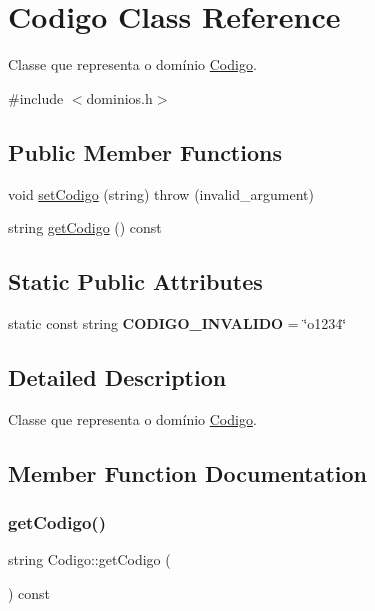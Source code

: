 \hypertarget{classCodigo}{}\section{Codigo Class Reference}
\label{classCodigo}


Classe que representa o domínio \hyperlink{classCodigo}{Codigo}.  




{\ttfamily \#include $<$dominios.\+h$>$}

\subsection*{Public Member Functions}
\begin{DoxyCompactItemize}
\item 
void \hyperlink{classCodigo_a863651a26dd7112dccced628aa96d86e}{set\+Codigo} (string)  throw (invalid\+\_\+argument)
\item 
string \hyperlink{classCodigo_ac263b3f7ff4f995fa72ad9101f1a8533}{get\+Codigo} () const
\end{DoxyCompactItemize}
\subsection*{Static Public Attributes}
\begin{DoxyCompactItemize}
\item 
\mbox{\label{classCodigo_a4d804b1d7086a7a985cd735e19bb09cf}} 
static const string {\bfseries C\+O\+D\+I\+G\+O\+\_\+\+I\+N\+V\+A\+L\+I\+DO} = \char`\"{}o1234\char`\"{}
\end{DoxyCompactItemize}


\subsection{Detailed Description}
Classe que representa o domínio \hyperlink{classCodigo}{Codigo}. 

\subsection{Member Function Documentation}
\mbox{\label{classCodigo_ac263b3f7ff4f995fa72ad9101f1a8533}} 
\subsubsection{\texorpdfstring{get\+Codigo()}{getCodigo()}}
{\footnotesize\ttfamily string Codigo\+::get\+Codigo (\begin{DoxyParamCaption}{ }\end{DoxyParamCaption}) const\hspace{0.3cm}{\ttfamily [inline]}}

